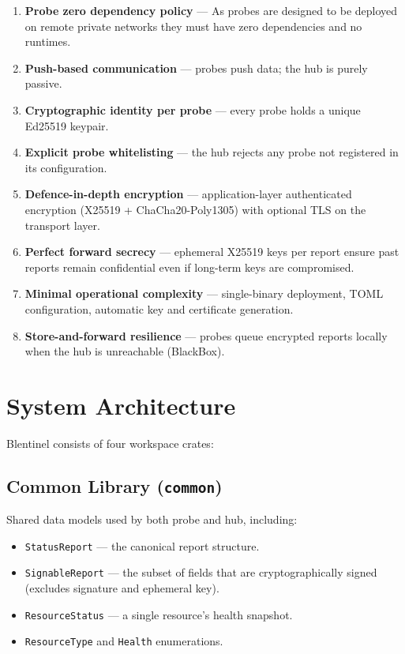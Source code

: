 \documentclass[12pt]{report}
\begin{document}
\begin{enumerate}
    \item \textbf{Probe zero dependency policy} --- As probes are designed to
    	  be deployed on remote private networks they must have zero dependencies
    	  and no runtimes.
    \item \textbf{Push-based communication} --- probes push data; the hub is
		  purely passive.
    \item \textbf{Cryptographic identity per probe} --- every probe holds a
          unique Ed25519 keypair.
    \item \textbf{Explicit probe whitelisting} --- the hub rejects any probe
          not registered in its configuration.
    \item \textbf{Defence-in-depth encryption} --- application-layer
          authenticated encryption (X25519 + ChaCha20-Poly1305) with optional
          TLS on the transport layer.
    \item \textbf{Perfect forward secrecy} --- ephemeral X25519 keys per
          report ensure past reports remain confidential even if long-term keys
          are compromised.
    \item \textbf{Minimal operational complexity} --- single-binary deployment,
          TOML configuration, automatic key and certificate generation.
    \item \textbf{Store-and-forward resilience} --- probes queue encrypted
          reports locally when the hub is unreachable (BlackBox).
\end{enumerate}

\section{System Architecture}

Blentinel consists of four workspace crates:

\subsection{Common Library (\texttt{common})}

Shared data models used by both probe and hub, including:

\begin{itemize}
    \item \texttt{StatusReport} --- the canonical report structure.
    \item \texttt{SignableReport} --- the subset of fields that are
          cryptographically signed (excludes signature and ephemeral key).
    \item \texttt{ResourceStatus} --- a single resource's health snapshot.
    \item \texttt{ResourceType} and \texttt{Health} enumerations.
\end{itemize}
\end{document}
